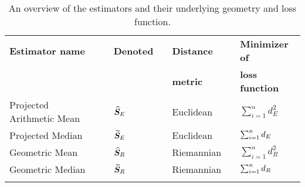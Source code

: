 \begin{table}[h]
\caption{An overview of the estimators and their underlying geometry and loss function.}  \label{tab:ests.sum}
\centering
\begin{tabular}{ lclclcl}\hline
\rule[2mm]{0mm}{1mm} \textbf{Estimator name} & & \textbf{Denoted} & & \textbf{Distance} &&\textbf{Minimizer of}\\ 
\rule[2mm]{0mm}{1mm}  & &  & & \textbf{metric} &&\textbf{loss function}\\ 
\hline \hline 
\rule[2mm]{0mm}{6mm} Projected Arithmetic Mean & & ${\widehat{\bm S}_E}$ & & Euclidean &&$\sum_{i=1}^n d^2_E$  \\
\rule[2mm]{0mm}{6mm} Projected Median & & ${\widetilde{\bm S}_E}$ & & Euclidean && $\sum_{i=1}^n{d_E}$ \\
\rule[2mm]{0mm}{6mm} Geometric Mean & & ${\widehat{\bm S}_R}$&  & Riemannian && $\sum_{i=1}^n d^2_R$\\
\rule[2mm]{0mm}{6mm} Geometric Median & & ${\widetilde{\bm S}_R}$&  & Riemannian &&$\sum_{i=1}^n{d_R}$ \\[-7mm] 
\rule[2mm]{0mm}{6mm} & & & & \\ \hline
\end{tabular}
\end{table}
